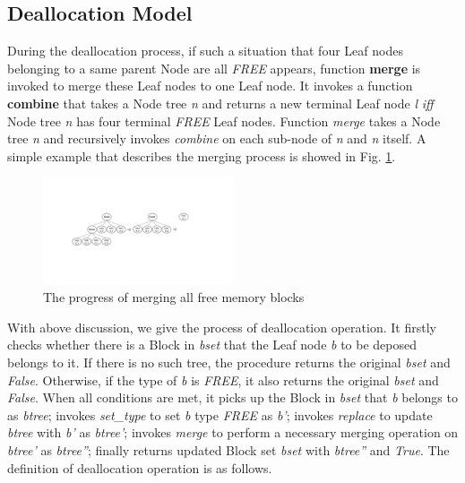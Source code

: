 \subsection{Deallocation Model}
During the deallocation process, if such a situation that four Leaf nodes belonging to a same parent Node are all \emph{FREE} appears, function \textbf{merge} is invoked to merge these Leaf nodes to one Leaf node. It invokes a function \textbf{combine} that takes a Node tree \emph{n} and returns a new terminal Leaf node \emph{l} \emph{iff} Node tree \emph{n} has four terminal \emph{FREE} Leaf nodes. Function \emph{merge} takes a Node tree \emph{n} and recursively invokes \emph{combine} on each sub-node of \emph{n} and \emph{n} itself. A simple example that describes the merging process is showed in Fig. \ref{fig2}.

\begin{figure}[htbp]
	\centering
	\includegraphics[width=0.5\textwidth]{fig2.pdf}
	\caption{The progress of merging all free memory blocks}
	\label{fig2}
\end{figure}

With above discussion, we give the process of deallocation operation. It firstly checks whether there is a Block in \emph{bset} that the Leaf node \emph{b} to be deposed belongs to it. If there is no such tree, the procedure returns the original \emph{bset} and \emph{False}. Otherwise, if the type of \emph{b} is \emph{FREE}, it also returns the original \emph{bset} and \emph{False}. When all conditions are met, it picks up the Block in \emph{bset} that \emph{b} belongs to as \emph{btree}; invokes \emph{set\_type} to set \emph{b} type \emph{FREE} as \emph{b'}; invokes \emph{replace} to update \emph{btree} with \emph{b'} as \emph{btree'}; invokes \emph{merge} to perform a necessary merging operation on \emph{btree'} as \emph{btree''}; finally returns updated Block set \emph{bset} with \emph{btree''} and \emph{True}. The definition of deallocation operation is as follows.

